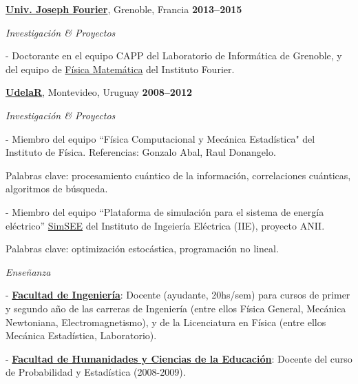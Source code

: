 \documentclass[10pt]{article}
\newenvironment{outerlist}[1][\enskip\textbullet]%
        {\begin{itemize}[#1]}{\end{itemize}%
         \vspace{-.6\baselineskip}}
\newenvironment{innerlist}[1][\enskip\textbullet]%
        {\begin{compactitem}[#1]}{\end{compactitem}}
\newcommand{\blankline}{\quad\pagebreak[2]}
\begin{document}
\blankline

\href{http://www.ujf-grenoble.fr/}{\textbf{Univ. Joseph Fourier}}, Grenoble, Francia
\hfill\textbf{2013--2015}

\begin{outerlist}
\item[]\textit{Investigación \& Proyectos}
\begin{innerlist}
\item[-] Doctorante en el equipo CAPP del Laboratorio de Informática de Grenoble, y del equipo de \href{http://www-fourier.ujf-grenoble.fr/?q=fr/content/physique-mathematique}{Física Matemática} del Instituto Fourier.
\end{innerlist}
\end{outerlist}

\blankline

\href{http://www.udelar.edu.uy}{\textbf{UdelaR}}, Montevideo, Uruguay 
\hfill\textbf{2008--2012}

\begin{outerlist}
\item[]\textit{Investigación \& Proyectos}
\begin{innerlist}
\item[-] Miembro del equipo ``Física Computacional y Mecánica Estadística" del Instituto de Física. Referencias: Gonzalo Abal, Raul Donangelo. 

Palabras clave: procesamiento cuántico de la información, correlaciones cuánticas, algoritmos de búsqueda. 
\item[-] Miembro del equipo ``Plataforma de simulaci\'{o}n para el sistema de energ\'{i}a el\'{e}ctrico'' \href{http://iie.fing.edu.uy/simsee/}{SimSEE} del Instituto de Ingeiería Eléctrica (IIE), proyecto ANII. 

Palabras clave: optimización estocástica, programación no lineal.
\end{innerlist}

\item[]\textit{Enseñanza}
\begin{innerlist}
	\item[-] \href{http://www.fing.edu.uy}{\textbf{Facultad de Ingenier\'ia}}: Docente (ayudante, 20hs/sem) para cursos de primer y segundo año de las carreras de Ingeniería (entre ellos Física General, Mecánica Newtoniana, Electromagnetismo), y de la Licenciatura en Física (entre ellos Mecánica Estadística, Laboratorio).
	\item[-] \href{http://www.fhuce.edu.uy/}{\textbf{Facultad de Humanidades y Ciencias de la Educaci\'{o}n}}: Docente del curso de Probabilidad y Estadística (2008-2009).
\end{innerlist}

\end{outerlist}
\end{document}
